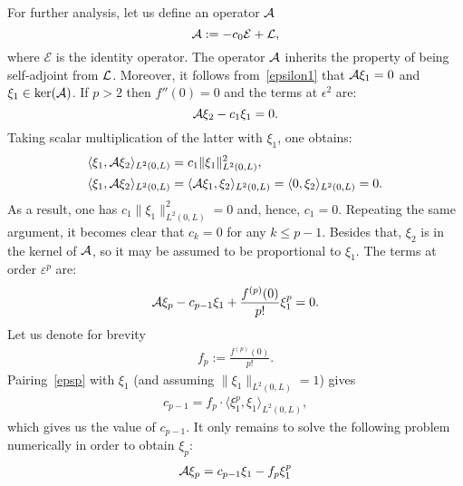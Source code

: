 	 For further analysis, let us define an operator $\mathcal{A}$ 
\begin{equation*}
	\mathcal{A} :=  - c_0 \mathcal{E} + \mathcal{L},
\end{equation*}
where $\mathcal{E}$ is the identity operator. The operator $\mathcal{A}$ inherits the property of being 
self-adjoint from $\mathcal{L}$. Moreover, it follows from~\eqref{epsilon1} that $\mathcal{A} \xi_1 = 0$ and $\xi_1 \in \ker(\mathcal{A})$. 
If $p>2$ then $f''(0)=0$ and the terms at $\epsilon^2$ are:
\begin{equation}
\mathcal{A} \xi_2 - c_1\xi_1 = 0.
\end{equation}
	 Taking scalar multiplication of the latter with $\xi_1$, one obtains:
\begin{align*}
	&\langle\xi_1, \mathcal{A}\xi_2 \rangle_{L^2(0,L)} = c_1 \| \xi_1\|^2_{L^2(0,L)}, \\
	&\langle\xi_1, \mathcal{A}\xi_2\rangle_{L^2(0,L)} = \langle\mathcal{A} \xi_1, \xi_2\rangle_{L^2(0,L)} = \langle0, \xi_2\rangle_{L^2(0,L)} = 0.
\end{align*}
	 As a result, one has $c_1 \| \xi_1\|^2_{L^2(0,L)} = 0$ and, hence, $c_1 = 0$.
	Repeating the same argument, it becomes clear that $c_k = 0$ for any $k \leq p-1$.
	Besides that, $\xi_2$ is in the kernel of $\mathcal{A}$, so it may be assumed to be proportional to $\xi_1$.
	The terms at order $\varepsilon^p$ are:
\begin{align}
  \mathcal{A} \xi_p - c_{p-1}\xi_1 + \frac{f^{(p)}(0)}{p!} \xi_1^p = 0. \label{epsp}
\end{align}
	 Let us denote for brevity
\begin{align*}
	f_p := \frac{f^{(p)}(0)}{p!}.
\end{align*}
	 Pairing~\eqref{epsp} with $\xi_1$ (and assuming $\| \xi_1 \|_{L^2(0,L)} = 1$) gives
\begin{align}
	c_{p-1} = f_p	\cdot \langle\xi_1^p, \xi_1\rangle_{L^2(0,L)}, \label{cp-1}
\end{align}
	 which gives us the value of $c_{p-1}$.
	It only remains to solve the following problem numerically in order to obtain $\xi_p$:
\begin{align}
  \mathcal{A} \xi_p = c_{p-1}\xi_1 - f_p\xi_1^p \label{epsilonp}
\end{align}

